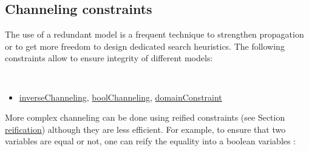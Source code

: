 

\subsection{Channeling constraints}\label{model:channelingconstraints}\hypertarget{model:channelingconstraints}{}
The use of a redundant model is a frequent technique to strengthen propagation or to get more freedom to design dedicated search heuristics. The following constraints allow to ensure integrity of different models:
\begin{notedef}\tt
  \begin{itemize}
  \item \hyperlink{inversechanneling:inversechannelingconstraint}{inverseChanneling}, \hyperlink{boolchanneling:boolchannelingconstraint}{boolChanneling}, \hyperlink{domainconstraint:domainconstraintconstraint}{domainConstraint}
  \end{itemize}
\end{notedef}
More complex channeling can be done using reified constraints (see Section \hyperlink{model:reifiedconstraints}{reification}) although they are less efficient. For example, to ensure that two variables are equal or not, one can reify the equality into a boolean variables :




